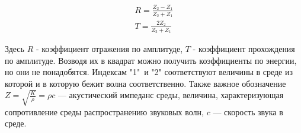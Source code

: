 \begin{equation}
	\begin{aligned}
		R=\frac{Z_2-Z_1}{Z_2+Z_1} \\ 
		T=\frac{2 Z_2}{Z_2+Z_1}
	\end{aligned}
\end{equation}

Здесь $R$ - коэффициент отражения по амплитуде, $T$ - коэффициент прохождения по амплитуде. Возводя их в квадрат можно получить коэффициенты по энергии, но они не понадобятся. Индексам  "1"\ и "2" соответствуют величины в среде из которой и в которую бежит волна соответственно. Также важное обозначение $Z = \sqrt{\frac{K}{\rho}} = \rho c$ --- акустический импеданс среды, величина, характеризующая сопротивление среды распространению звуковых волн, $c$ --- скорость звука в среде.



\newpage
